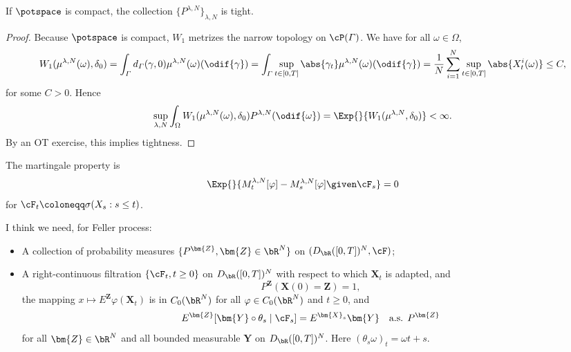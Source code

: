 \begin{lemma}
  If \(\potspace\) is compact, the collection \(\{P^{\lambda, N}\}_{\lambda,N}\) is tight.
\end{lemma}
\begin{proof}
  Because \(\potspace\) is compact, \(W_1\) metrizes the narrow topology on \(\cP(\varGamma)\).
  We have for all \(\omega \in \Omega\),
  \begin{equation}
    W_1(\mu^{\lambda, N}(\omega), \delta_0)
    = \int_{\varGamma} d_\varGamma(\gamma,0) \mu^{\lambda,N}(\omega) (\odif{\gamma})
    = \int_{\varGamma} \sup_{t \in [0,T]} \abs{\gamma_t} \mu^{\lambda,N}(\omega) (\odif{\gamma})
    = \frac{1}{N} \sum_{i=1}^N \sup_{t \in [0,T]} \abs{X^i_t(\omega)} \leq C,
  \end{equation}
  for some \(C > 0\).
  Hence
  \begin{equation}
    \sup_{\lambda, N} \int_\Omega W_1(\mu^{\lambda, N}(\omega), \delta_0) P^{\lambda, N}(\odif{\omega})
    = \Exp{}{W_1(\mu^{\lambda, N}, \delta_0)} < \infty.
  \end{equation}
  By an OT exercise, this implies tightness.
\end{proof}



The martingale property is
\begin{equation}
  \Exp{}{M_t^{\lambda, N}[\varphi] - M_s^{\lambda, N}[\varphi] \given \cF_s} = 0
\end{equation}
for \(\cF_t \coloneqq \sigma(X_s : s \leq t)\).


I think we need, for Feller process:
\begin{itemize}
  \item A collection of probability measures \(\{P^\bm{Z}, \bm{Z} \in \bR^N\}\) on \((D_\bR([0,T])^N, \cF)\);

  \item A right-continuous filtration \(\{\cF_t, t \geq 0\}\) on \(D_\bR([0,T])^N\) with respect to which \(\bm{X}_t\) is adapted, and
        \begin{equation}
          P^\bm{Z}(\bm{X}(0) = \bm{Z}) = 1,
        \end{equation}
        the mapping \(x \mapsto E^\bm{Z} \varphi(\bm{X}_t)\) is in \(C_0(\bR^N)\) for all \(\varphi \in C_0(\bR^N)\) and \(t \geq 0\),
        and
        \begin{equation}
          E^\bm{Z}[ \bm{Y} \circ \theta_s \mid \cF_s] = E^{\bm{X}_s} \bm{Y} \quad \text{a.s. } P^\bm{Z}
        \end{equation}
        for all \(\bm{Z} \in \bR^N\) and all bounded measurable \(\bm{Y}\) on \(D_\bR([0,T])^N\). Here \((\theta_s\omega)_t = \omega{t+s}\).
\end{itemize}